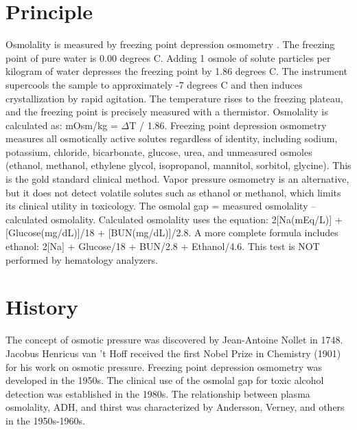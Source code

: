 \section*{Principle}
Osmolality is measured by freezing point depression osmometry \cite{tietz2012textbook}. The freezing point of pure water is 0.00 degrees C. Adding 1 osmole of solute particles per kilogram of water depresses the freezing point by 1.86 degrees C. The instrument supercools the sample to approximately -7 degrees C and then induces crystallization by rapid agitation. The temperature rises to the freezing plateau, and the freezing point is precisely measured with a thermistor. Osmolality is calculated as: mOsm/kg = $\Delta$T / 1.86. Freezing point depression osmometry measures all osmotically active solutes regardless of identity, including sodium, potassium, chloride, bicarbonate, glucose, urea, and unmeasured osmoles (ethanol, methanol, ethylene glycol, isopropanol, mannitol, sorbitol, glycine). This is the gold standard clinical method. Vapor pressure osmometry is an alternative, but it does not detect volatile solutes such as ethanol or methanol, which limits its clinical utility in toxicology. The osmolal gap = measured osmolality -- calculated osmolality. Calculated osmolality uses the equation: 2[Na(mEq/L)] + [Glucose(mg/dL)]/18 + [BUN(mg/dL)]/2.8. A more complete formula includes ethanol: 2[Na] + Glucose/18 + BUN/2.8 + Ethanol/4.6. This test is NOT performed by hematology analyzers.

\section*{History}
The concept of osmotic pressure was discovered by Jean-Antoine Nollet in 1748. Jacobus Henricus van 't Hoff received the first Nobel Prize in Chemistry (1901) for his work on osmotic pressure. Freezing point depression osmometry was developed in the 1950s. The clinical use of the osmolal gap for toxic alcohol detection was established in the 1980s. The relationship between plasma osmolality, ADH, and thirst was characterized by Andersson, Verney, and others in the 1950s-1960s.

